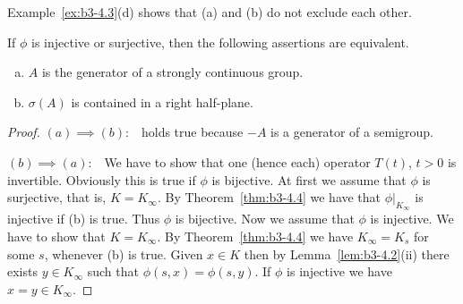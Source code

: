 Example~\ref{ex:b3-4.3}(d) shows that (a) and (b) do not exclude each other.
\begin{corollary}\label{cor:b3-4.5}
	If $\phi$ is injective or surjective, then the following assertions are equivalent.
	\begin{enumerate}[(a)]
		\item 
		$A$ is the generator of a strongly continuous group.
		
		\item 
		$\sigma(A)$ is contained in a right half-plane.
	\end{enumerate}
\end{corollary}
%
\begin{proof}
	$(a)\implies(b)$:\ \  holds true because $-A$ is a generator of a semigroup.
	
	$(b)\implies(a)$:\ \ 
	We have to show that one (hence each) operator $T(t)$, $t > 0$ is invertible.
	Obviously this is true if $\phi$ is bijective.
	At first we assume that $\phi$ is surjective, that is, $K = K_{\infty}$.
	By Theorem~\ref{thm:b3-4.4} we have that $\phi|_{K_{\infty}}$ is injective if (b) is true.
	Thus $\phi$ is bijective.
	Now we assume that $\phi$ is injective.
	We have to show that $K = K_{\infty}$.
	By Theorem~\ref{thm:b3-4.4} we have $K_{\infty} = K_{s}$ for some $s$, whenever (b) is true.
	Given $x \in K$ then by Lemma~\ref{lem:b3-4.2}(ii) there exists $y \in K_{\infty}$ such that $\phi(s,x) = \phi(s,y)$.
	If $\phi$ is injective we have $x = y \in K_{\infty}$.
\end{proof}
